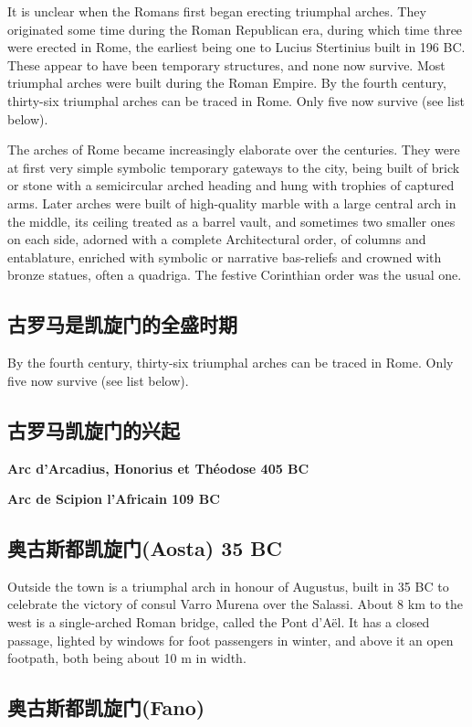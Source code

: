 \documentclass[a4paper,dvipdfm]{article}
\begin{document}
It is unclear when the Romans first began erecting triumphal arches.
They originated some time during the Roman Republican era, during
which time three were erected in Rome, the earliest being one to
Lucius Stertinius built in 196 BC. These appear to have been temporary
structures, and none now survive. Most triumphal arches were built
during the Roman Empire. By the fourth century, thirty-six triumphal
arches can be traced in Rome. Only five now survive (see list below).

The arches of Rome became increasingly elaborate over the centuries.
They were at first very simple symbolic temporary gateways to the
city, being built of brick or stone with a semicircular arched heading
and hung with trophies of captured arms. Later arches were built of
high-quality marble with a large central arch in the middle, its
ceiling treated as a barrel vault, and sometimes two smaller ones on
each side, adorned with a complete Architectural order, of columns and
entablature, enriched with symbolic or narrative bas-reliefs and
crowned with bronze statues, often a quadriga. The festive Corinthian
order was the usual one.

\subsection{古罗马是凯旋门的全盛时期}
By the fourth century, thirty-six triumphal arches can be traced in
Rome. Only five now survive (see list below).
\subsection{古罗马凯旋门的兴起}

\textbf{Arc d’Arcadius, Honorius et Théodose 405 BC}

\textbf{Arc de Scipion l'Africain 109 BC}

\subsection{奥古斯都凯旋门(Aosta) 35 BC}

Outside the town is a triumphal arch in honour of Augustus, built in
35 BC to celebrate the victory of consul Varro Murena over the
Salassi. About 8 km to the west is a single-arched Roman bridge,
called the Pont d'Aël. It has a closed passage, lighted by windows for
foot passengers in winter, and above it an open footpath, both being
about 10 m in width.

\subsection{奥古斯都凯旋门(Fano)}
\end{document}
